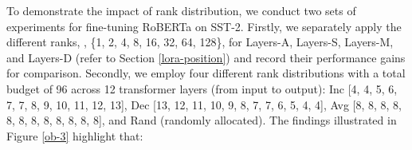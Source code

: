 

To demonstrate the impact of rank distribution, we conduct two sets of experiments for fine-tuning RoBERTa on SST-2. 
Firstly, we separately apply the different ranks, \ie, \{1, 2, 4, 8, 16, 32, 64, 128\}, for Layers-A, Layers-S, Layers-M, and Layers-D (refer to Section \ref{lora-position}) and record their performance gains for comparison.
Secondly, we employ four different rank distributions with a total budget of 96 across 12 transformer layers (from input to output): Inc [4, 4, 5, 6, 7, 7, 8, 9, 10, 11, 12, 13], Dec [13, 12, 11, 10, 9, 8, 7, 7, 6, 5, 4, 4], Avg [8, 8, 8, 8, 8, 8, 8, 8, 8, 8, 8, 8], and Rand (randomly allocated).
The findings illustrated in Figure \ref{ob-3} highlight that:
% 


